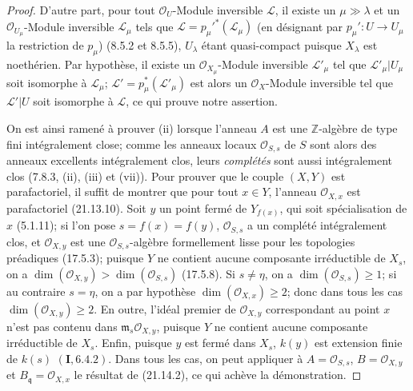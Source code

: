 \begin{proof}
D'autre part, pour tout $\mathcal O_U$-Module inversible $\mathscr L$, il existe un
$\mu\gg\lambda$ et un $\mathcal O_{U_\mu}$-Module inversible $\mathscr L_\mu$ tels
que $\mathscr L=p_\mu'^*(\mathscr L_\mu)$ (en désignant par
$p_\mu':U\to U_\mu$ la restriction de $p_\mu$) (8.5.2 et 8.5.5), $U_\lambda$ étant
quasi-compact puisque $X_\lambda$ est noethérien. Par hypothèse, il existe un
$\mathcal O_{X_\mu}$-Module inversible $\mathscr L'_\mu$ tel que
$\mathscr L'_\mu|U_\mu$ soit isomorphe à $\mathscr L_\mu$;
$\mathscr L'=p_\mu^*(\mathscr L'_\mu)$ est alors un $\mathcal O_X$-Module
inversible tel que $\mathscr L'|U$ soit isomorphe à $\mathscr L$, ce qui prouve notre
assertion.

On est ainsi ramené à prouver (ii) lorsque l'anneau $A$ est une
$\mathbb Z$-algèbre de type fini intégralement close; comme les anneaux locaux
$\mathcal O_{S,s}$ de $S$ sont alors des anneaux excellents intégralement clos, leurs
\emph{complétés} sont aussi intégralement clos (7.8.3, (ii), (iii) et (vii)). Pour
prouver que le couple $(X,Y)$ est parafactoriel, il suffit de montrer que pour tout
$x\in Y$, l'anneau $\mathcal O_{X,x}$ est parafactoriel (21.13.10). Soit $y$ un point
fermé de $Y_{f(x)}$, qui soit spécialisation de $x$ (5.1.11); si l'on pose
$s=f(x)=f(y)$, $\mathcal O_{S,s}$ a un
complété intégralement clos, et $\mathcal O_{X,y}$ est une
$\mathcal O_{S,s}$-algèbre formellement lisse pour les topologies préadiques
(17.5.3); puisque $Y$ ne contient aucune composante irréductible de $X_s$, on a
$\dim(\mathcal O_{X,y})>\dim(\mathcal O_{S,s})$ (17.5.8). Si $s\neq\eta$, on a
$\dim(\mathcal O_{S,s})\geq1$; si au contraire $s=\eta$, on a par hypothèse
$\dim(\mathcal O_{X,x})\geq2$; donc dans tous les cas
$\dim(\mathcal O_{X,y})\geq2$. En outre, l'idéal premier de $\mathcal O_{X,y}$
correspondant au point $x$ n'est pas contenu dans
$\mathfrak m_s\mathcal O_{X,y}$, puisque $Y$ ne contient aucune composante
irréductible de $X_s$. Enfin, puisque $y$ est fermé dans $X_s$, $k(y)$ est extension
finie de $k(s)$ $(\mathbf I, 6.4.2)$. Dans tous les cas, on peut appliquer à
$A=\mathcal O_{S,s}$, $B=\mathcal O_{X,y}$ et
$B_\mathfrak q=\mathcal O_{X,x}$ le résultat de (21.14.2), ce qui achève la
démonstration.
\end{proof}


